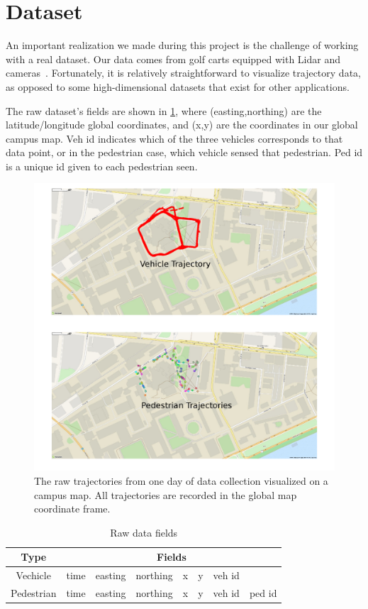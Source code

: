 
\section{Dataset} \label{sec:dataset}

An important realization we made during this project is the challenge of working with a real dataset.
Our data comes from golf carts equipped with Lidar and cameras~\cite{Miller16_IROS,Miller17_predictive_ICRA}.
Fortunately, it is relatively straightforward to visualize trajectory data, as opposed to some high-dimensional datasets that exist for other applications. 

The raw dataset's fields are shown in \cref{table_data}, where (easting,northing) are the latitude/longitude global coordinates, and (x,y) are the coordinates in our global campus map.
Veh id indicates which of the three vehicles corresponds to that data point, or in the pedestrian case, which vehicle sensed that pedestrian.
Ped id is a unique id given to each pedestrian seen.

\begin{figure}
	\centering
	\includegraphics [trim=0 0 0 0, clip, angle=0, width=0.8\columnwidth,
	keepaspectratio]{figures/traj_on_map}
	\caption{The raw trajectories from one day of data collection visualized on a campus map. All trajectories are recorded in the global map coordinate frame.} 
	\label{fig:traj_on_map} 
\end{figure}

\begin{table}[ht!]
\centering
\begin{tabular}{||c||c c c c c c c||}  
 \hline
 \multirow{1}{*}{Type} &
       \multicolumn{7}{c||}{Fields} \\
 \hline\hline
 Vechicle & time & easting & northing & x & y & veh id & \\ \hline
 Pedestrian & time & easting & northing & x & y & veh id & ped id \\ \hline
\end{tabular}
\caption{Raw data fields}
\label{table_data}
\end{table}

